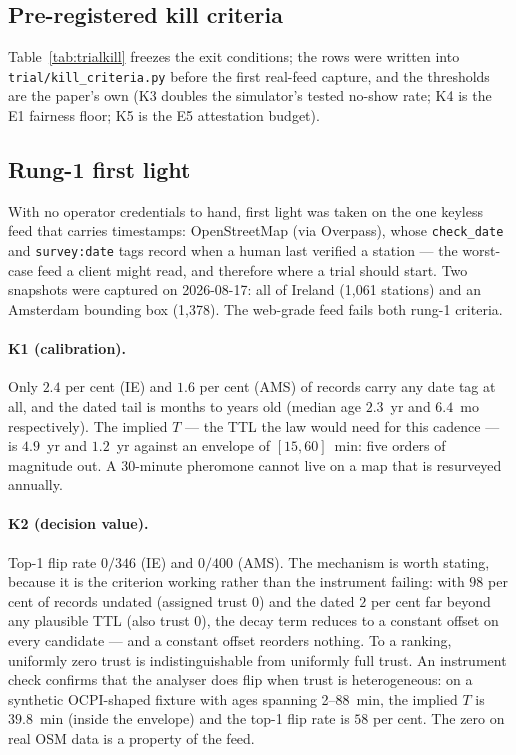 \documentclass[twoside,twocolumn,usenatbib]{mnras}
\begin{document}
\subsection{Pre-registered kill criteria}

Table~\ref{tab:trialkill} freezes the exit conditions; the rows
were written into \texttt{trial/kill\_criteria.py} before the first
real-feed capture, and the thresholds are the paper's own (K3
doubles the simulator's tested no-show rate; K4 is the E1 fairness
floor; K5 is the E5 attestation budget).



\subsection{Rung-1 first light}
\label{app:firstlight}

With no operator credentials to hand, first light was taken on the
one keyless feed that carries timestamps: OpenStreetMap (via
Overpass), whose \texttt{check\_date} and \texttt{survey:date} tags
record when a human last verified a station --- the worst-case feed
a client might read, and therefore where a trial should start.  Two
snapshots were captured on 2026-08-17: all of Ireland (1{,}061
stations) and an Amsterdam bounding box (1{,}378).  The web-grade
feed fails both rung-1 criteria.

\paragraph{K1 (calibration).}  Only $2.4$ per cent (IE) and $1.6$
per cent (AMS) of records carry any date tag at all, and the dated
tail is months to years old (median age $2.3$~yr and $6.4$~mo
respectively).  The implied $T$ --- the TTL the law would need for
this cadence --- is $4.9$~yr and $1.2$~yr against an envelope of
$[15, 60]$~min: five orders of magnitude out.  A 30-minute
pheromone cannot live on a map that is resurveyed annually.

\paragraph{K2 (decision value).}  Top-1 flip rate $0/346$ (IE) and
$0/400$ (AMS).  The mechanism is worth stating, because it is the
criterion working rather than the instrument failing: with $98$
per cent of records undated (assigned trust $0$) and the dated $2$
per cent far beyond any plausible TTL (also trust $0$), the decay
term reduces to a constant offset on every candidate --- and a
constant offset reorders nothing.  To a ranking, uniformly zero
trust is indistinguishable from uniformly full trust.  An
instrument check confirms that the analyser does flip when trust is
heterogeneous: on a synthetic OCPI-shaped fixture with ages
spanning 2--88~min, the implied $T$ is $39.8$~min (inside the
envelope) and the top-1 flip rate is $58$ per cent.  The zero on
real OSM data is a property of the feed.
\end{document}
